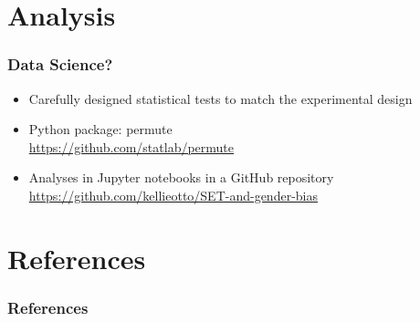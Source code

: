\documentclass{beamer}
\begin{document}
\section{Analysis}
\frame
{
 \frametitle{Data Science?}
\Large
 \begin{itemize}
 \itemsep 20pt
 \item Carefully designed statistical tests to match the experimental design
 \item{Python package: permute \\
 \url{https://github.com/statlab/permute}
 }
 \item{Analyses in Jupyter notebooks in a GitHub repository \\
 \url{https://github.com/kellieotto/SET-and-gender-bias}
 }
 \end{itemize}

}

\section{References}


\begin{frame}
\frametitle{References}


\itemize
\end{frame}
\end{document}
